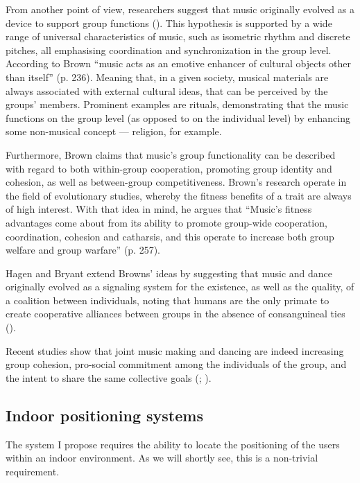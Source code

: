 \documentclass[a4paper,11pt]{article}
\begin{document}
From another point of view, researchers suggest that music originally evolved as a device to support group functions (\cite{Brown2000}).
This hypothesis is supported by a wide range of universal characteristics of music, such as isometric rhythm and discrete pitches, all emphasising coordination and synchronization in the group level.
According to Brown ``music acts as an emotive enhancer of cultural objects other than itself'' (p. 236).
Meaning that, in a given society, musical materials are always associated with external cultural ideas, that can be perceived by the groups' members.
Prominent examples are rituals, demonstrating that the music functions on the group level (as opposed to on the individual level) by enhancing some non-musical concept ---  religion, for example.

Furthermore, Brown claims that music's group functionality can be described with regard to both within-group cooperation, promoting group identity and cohesion, as well as between-group competitiveness.
Brown's research operate in the field of evolutionary studies, whereby the fitness benefits of a trait are always of high interest.
With that idea in mind, he argues that ``Music's fitness advantages come about from its ability to promote group-wide cooperation, coordination, cohesion and catharsis, and this operate to increase both group welfare and group warfare'' (p. 257).

Hagen and Bryant extend Browns' ideas by suggesting that music and dance originally evolved as a signaling system for the existence, as well as the quality, of a coalition between individuals, noting that humans are the only primate to create cooperative alliances between groups in the absence of consanguineal ties (\cite*{Hagen2003}).

Recent studies show that joint music making and dancing are indeed increasing group cohesion, pro-social commitment among the individuals of the group, and the intent to share the same collective goals (\cite{Kirschner2010}; \cite{Knoblich2011}).

\subsection{Indoor positioning systems}

The system I propose requires the ability to locate the positioning of the users within an indoor environment.
As we will shortly see, this is a non-trivial requirement.
\end{document}
